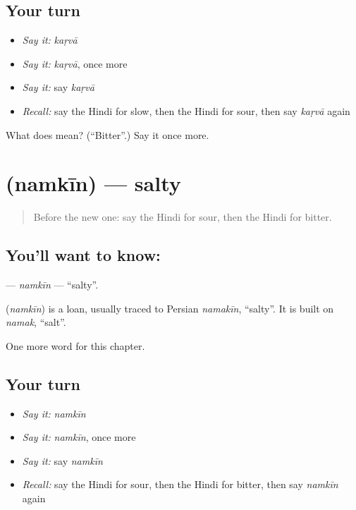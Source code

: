 \subsection*{Your turn}
\begin{itemize}
\raggedright
  \item \emph{Say it:} \emph{kaṛvā}
  \item \emph{Say it:} \emph{kaṛvā}, once more
  \item \emph{Say it:} say \emph{kaṛvā}
  \item \emph{Recall:} say the Hindi for slow, then the Hindi for sour, then say \emph{kaṛvā} again
\end{itemize}

\begin{tcolorbox}[breakable,colback=teal!4,colframe=teal!35!black,title={Before you move on}]
What does  mean? (\textquotedblleft{}Bitter\textquotedblright{}.) Say it once more.
\end{tcolorbox}
\section[\texorpdfstring{\hi{नमकीन} (namkīn)}{नमकीन (namkīn)}]{ (namkīn) — salty}

\label{lesson:HI-C156-namkin}



\begin{quote}
Before the new one: say the Hindi for sour, then the Hindi for bitter.
\end{quote}

\subsection*{You'll want to know: }
\textbf{} — \emph{namkīn} — \textquotedblleft{}salty\textquotedblright{}.

\begin{cousinweb}
\textbf{} (\emph{namkīn}) is a loan, usually traced to Persian \emph{namakīn}, \textquotedblleft{}salty\textquotedblright{}. It is built on \emph{namak}, \textquotedblleft{}salt\textquotedblright{}.
\end{cousinweb}

\begin{grammarlens}[title={What you've built}]
One more word for this chapter.
\end{grammarlens}

\subsection*{Your turn}
\begin{itemize}
\raggedright
  \item \emph{Say it:} \emph{namkīn}
  \item \emph{Say it:} \emph{namkīn}, once more
  \item \emph{Say it:} say \emph{namkīn}
  \item \emph{Recall:} say the Hindi for sour, then the Hindi for bitter, then say \emph{namkīn} again
\end{itemize}

